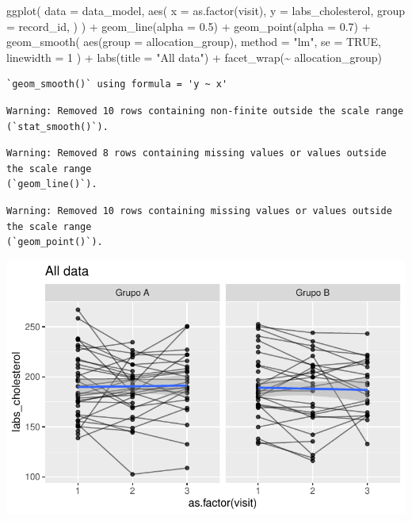 \documentclass[
  letterpaper,
  DIV=11,
  numbers=noendperiod]{scrartcl}
\newenvironment{Shaded}{\begin{snugshade}}{\end{snugshade}}
\newcommand{\AttributeTok}[1]{\textcolor[rgb]{0.40,0.45,0.13}{#1}}
\newcommand{\ConstantTok}[1]{\textcolor[rgb]{0.56,0.35,0.01}{#1}}
\newcommand{\DecValTok}[1]{\textcolor[rgb]{0.68,0.00,0.00}{#1}}
\newcommand{\FloatTok}[1]{\textcolor[rgb]{0.68,0.00,0.00}{#1}}
\newcommand{\FunctionTok}[1]{\textcolor[rgb]{0.28,0.35,0.67}{#1}}
\newcommand{\NormalTok}[1]{\textcolor[rgb]{0.00,0.23,0.31}{#1}}
\newcommand{\SpecialCharTok}[1]{\textcolor[rgb]{0.37,0.37,0.37}{#1}}
\newcommand{\StringTok}[1]{\textcolor[rgb]{0.13,0.47,0.30}{#1}}
\begin{document}
\begin{Shaded}
\begin{Highlighting}[]
\FunctionTok{ggplot}\NormalTok{(}
    \AttributeTok{data =}\NormalTok{ data\_model, }
    \FunctionTok{aes}\NormalTok{(}
        \AttributeTok{x =} \FunctionTok{as.factor}\NormalTok{(visit),}
        \AttributeTok{y =}\NormalTok{ labs\_cholesterol,}
        \AttributeTok{group =}\NormalTok{ record\_id,}
\NormalTok{    )}
\NormalTok{) }\SpecialCharTok{+}
    \FunctionTok{geom\_line}\NormalTok{(}\AttributeTok{alpha =} \FloatTok{0.5}\NormalTok{) }\SpecialCharTok{+}
    \FunctionTok{geom\_point}\NormalTok{(}\AttributeTok{alpha =} \FloatTok{0.7}\NormalTok{) }\SpecialCharTok{+}
    \FunctionTok{geom\_smooth}\NormalTok{(}
        \FunctionTok{aes}\NormalTok{(}\AttributeTok{group =}\NormalTok{ allocation\_group),}
        \AttributeTok{method =} \StringTok{"lm"}\NormalTok{,}
        \AttributeTok{se =} \ConstantTok{TRUE}\NormalTok{,}
        \AttributeTok{linewidth =} \DecValTok{1}
\NormalTok{    ) }\SpecialCharTok{+}
    \FunctionTok{labs}\NormalTok{(}\AttributeTok{title =} \StringTok{"All data"}\NormalTok{) }\SpecialCharTok{+}
    \FunctionTok{facet\_wrap}\NormalTok{(}\SpecialCharTok{\textasciitilde{}}\NormalTok{ allocation\_group) }
\end{Highlighting}
\end{Shaded}

\begin{verbatim}
`geom_smooth()` using formula = 'y ~ x'
\end{verbatim}

\begin{verbatim}
Warning: Removed 10 rows containing non-finite outside the scale range
(`stat_smooth()`).
\end{verbatim}

\begin{verbatim}
Warning: Removed 8 rows containing missing values or values outside the scale range
(`geom_line()`).
\end{verbatim}

\begin{verbatim}
Warning: Removed 10 rows containing missing values or values outside the scale range
(`geom_point()`).
\end{verbatim}

\includegraphics{Outcomes_V1V2V3_files/figure-pdf/labs_cholesterol_6-1.pdf}
\end{document}

